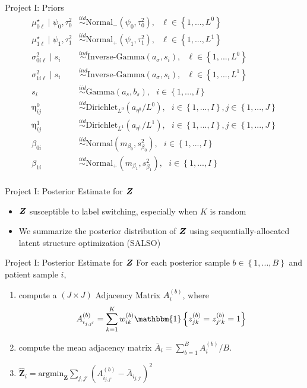 \documentclass[ignorenonframetext,]{beamer}
\newcommand{\iid}{\overset{iid}{\sim}}
\newcommand{\bc}[1]{ \left\{#1\right\} }
\newcommand{\bZ}{\mbox{\boldmath $Z$}}
\newcommand{\ind}{\overset{ind}{\sim}}
\newcommand{\Ind}[1]{\mathbbm{1}\bc{#1}}
\def\mus{\mu^\star}
\begin{document}
\begin{frame}{Project I: Priors}
\begin{align*}
\mus_{0\ell} \mid \psi_0, \tau^2_0 &\iid \text{Normal}_-(\psi_0, \tau^2_0), ~~~ \ell \in \bc{1,...,L^0} \\
\mus_{1\ell} \mid \psi_1, \tau^2_1 &\iid \text{Normal}_+(\psi_1, \tau^2_1), ~~~ \ell \in \bc{1,...,L^1} \\
\sigma^2_{0i\ell} \mid s_i &\ind \text{Inverse-Gamma}(a_\sigma, s_i), ~~~ \ell \in \bc{1,...,L^0} \\
\sigma^2_{1i\ell} \mid s_i &\ind \text{Inverse-Gamma}(a_\sigma, s_i), ~~~ \ell \in \bc{1,...,L^1}  \\
  s_i &\iid \text{Gamma}(a_s, b_s), ~~~ i \in \bc{1,...,I} \\
\bm\eta^0_{ij} &\iid \text{Dirichlet}_{L^0}(a_{\eta^0}/L^0), ~~~ i \in \bc{1,...,I}, j \in \bc{1,...,J} \\
\bm\eta^1_{ij} &\iid \text{Dirichlet}_{L^1}(a_{\eta^1}/L^1), ~~~ i \in \bc{1,...,I}, j \in \bc{1,...,J} \\
\beta_{0i} &\iid \text{Normal}(m_{\beta_0}, s^2_{\beta_0}), ~~~ i \in \bc{1,...,I} \\
\beta_{1i} &\iid \text{Normal}_+(m_{\beta_1}, s^2_{\beta_1}), ~~~ i \in \bc{1,...,I} \\
\end{align*}
\end{frame}

\begin{frame}{Project I: Posterior Estimate for $\bZ$}
  \begin{itemize}
    \setlength\itemsep{1em}
    \item $\bZ$ susceptible to label switching, especially when $K$ is random
    \item We summarize the posterior distribution of $\bZ$ using sequentially-allocated latent structure optimization (SALSO) \citep{salso}
  \end{itemize}
\end{frame}

\begin{frame}{Project I: Posterior Estimate for $\bZ$}
For each posterior sample $b\in \bc{1,...,B}$ and patient sample $i$,
\begin{enumerate}
\item compute a $(J\times J)$ Adjacency Matrix $A_i^{(b)}$, where
  $$
  A^{(b)}_{i_{j,j'}} = \sum_{k=1}^K w^{(b)}_{ik} 
  \Ind{ z^{(b)}_{jk} = z^{(b)}_{j^\prime k} = 1}
  $$
\item compute the mean adjacency matrix \(\bar A_i = \sum_{b=1}^B A_i^{(b)} /
B\).
\item $\hat{\bm Z}_i = \text{argmin}_{\bm Z} \sum_{j,j'} (A_{i_{j,j'}}^{(b)} - \bar A_{i_{j,j'}})^2$
\end{enumerate}
\end{frame}
\end{document}
